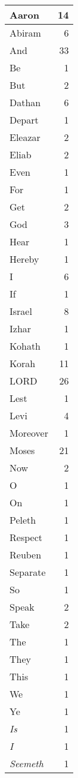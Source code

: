 \begin{center}
\begin{longtable}{l|r}
\hline \hline
\endlastfoot
Aaron & 14 \\ \hline
Abiram & 6 \\ \hline
And & 33 \\ \hline
Be & 1 \\ \hline
But & 2 \\ \hline
Dathan & 6 \\ \hline
Depart & 1 \\ \hline
Eleazar & 2 \\ \hline
Eliab & 2 \\ \hline
Even & 1 \\ \hline
For & 1 \\ \hline
Get & 2 \\ \hline
God & 3 \\ \hline
Hear & 1 \\ \hline
Hereby & 1 \\ \hline
I & 6 \\ \hline
If & 1 \\ \hline
Israel & 8 \\ \hline
Izhar & 1 \\ \hline
Kohath & 1 \\ \hline
Korah & 11 \\ \hline
LORD & 26 \\ \hline
Lest & 1 \\ \hline
Levi & 4 \\ \hline
Moreover & 1 \\ \hline
Moses & 21 \\ \hline
Now & 2 \\ \hline
O & 1 \\ \hline
On & 1 \\ \hline
Peleth & 1 \\ \hline
Respect & 1 \\ \hline
Reuben & 1 \\ \hline
Separate & 1 \\ \hline
So & 1 \\ \hline
Speak & 2 \\ \hline
Take & 2 \\ \hline
The & 1 \\ \hline
They & 1 \\ \hline
This & 1 \\ \hline
We & 1 \\ \hline
Ye & 1 \\ \hline
\emph{Is} & 1 \\ \hline
\emph{I} & 1 \\ \hline
\emph{Seemeth} & 1 \\ \hline

\end{longtable}
\end{center}

